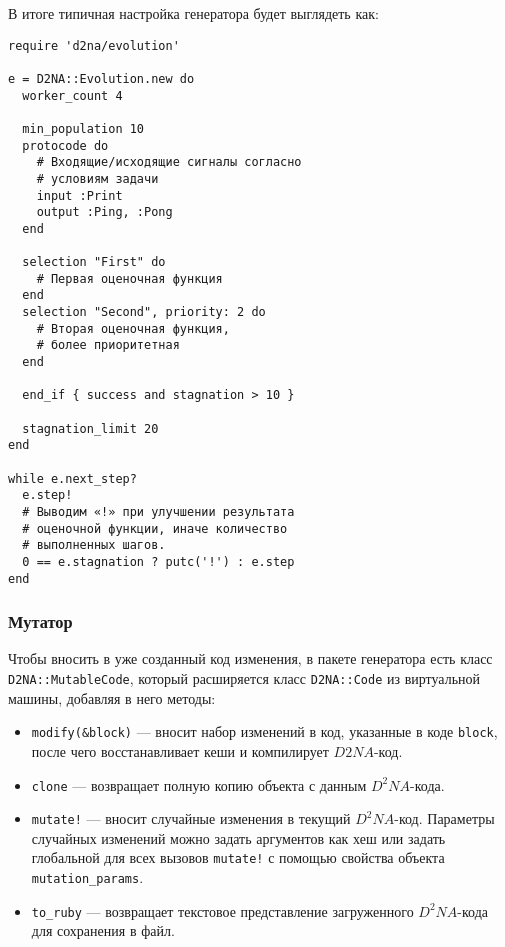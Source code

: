 \documentclass[utf8,a5paper,portrait,10pt]{eskdtext}
\begin{document}
\newpage
В итоге типичная настройка генератора будет выглядеть как:
\begin{verbatim}
require 'd2na/evolution'

e = D2NA::Evolution.new do
  worker_count 4
  
  min_population 10
  protocode do
    # Входящие/исходящие сигналы согласно
    # условиям задачи
    input :Print
    output :Ping, :Pong
  end
  
  selection "First" do
    # Первая оценочная функция
  end
  selection "Second", priority: 2 do
    # Вторая оценочная функция,
    # более приоритетная
  end
  
  end_if { success and stagnation > 10 }
  
  stagnation_limit 20
end

while e.next_step?
  e.step!
  # Выводим «!» при улучшении результата
  # оценочной функции, иначе количество
  # выполненных шагов.
  0 == e.stagnation ? putc('!') : e.step
end
\end{verbatim}

\subsubsection{Мутатор}

Чтобы вносить в уже созданный код изменения, в пакете генератора есть класс
\texttt{D2NA::MutableCode}, который расширяется класс \texttt{D2NA::Code} из
виртуальной машины, добавляя в него методы:
\begin{itemize}
  \item \texttt{modify(\&block)} — вносит набор изменений в код, указанные в
        коде \texttt{block}, после чего восстанавливает кеши и компилирует
        $D2NA$-код.
  \item \texttt{clone} — возвращает полную копию объекта с данным $D^2NA$-кода.
  \item \texttt{mutate!} — вносит случайные изменения в текущий $D^2NA$-код.
        Параметры случайных изменений можно задать аргументов как хеш или
        задать глобальной для всех вызовов \texttt{mutate!} с помощью свойства
        объекта \texttt{mutation\_params}.
  \item \texttt{to\_ruby} — возвращает текстовое представление загруженного
        $D^2NA$-кода для сохранения в файл.
\end{itemize}
\end{document}
